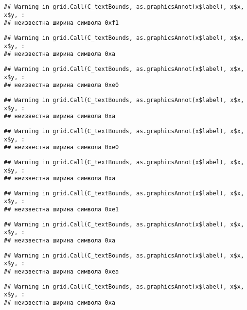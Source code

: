 \documentclass[
]{article}
\begin{document}
\begin{verbatim}
## Warning in grid.Call(C_textBounds, as.graphicsAnnot(x$label), x$x, x$y, :
## неизвестна ширина символа 0xf1
\end{verbatim}

\begin{verbatim}
## Warning in grid.Call(C_textBounds, as.graphicsAnnot(x$label), x$x, x$y, :
## неизвестна ширина символа 0xa
\end{verbatim}

\begin{verbatim}
## Warning in grid.Call(C_textBounds, as.graphicsAnnot(x$label), x$x, x$y, :
## неизвестна ширина символа 0xe0
\end{verbatim}

\begin{verbatim}
## Warning in grid.Call(C_textBounds, as.graphicsAnnot(x$label), x$x, x$y, :
## неизвестна ширина символа 0xa
\end{verbatim}

\begin{verbatim}
## Warning in grid.Call(C_textBounds, as.graphicsAnnot(x$label), x$x, x$y, :
## неизвестна ширина символа 0xe0
\end{verbatim}

\begin{verbatim}
## Warning in grid.Call(C_textBounds, as.graphicsAnnot(x$label), x$x, x$y, :
## неизвестна ширина символа 0xa
\end{verbatim}

\begin{verbatim}
## Warning in grid.Call(C_textBounds, as.graphicsAnnot(x$label), x$x, x$y, :
## неизвестна ширина символа 0xe1
\end{verbatim}

\begin{verbatim}
## Warning in grid.Call(C_textBounds, as.graphicsAnnot(x$label), x$x, x$y, :
## неизвестна ширина символа 0xa
\end{verbatim}

\begin{verbatim}
## Warning in grid.Call(C_textBounds, as.graphicsAnnot(x$label), x$x, x$y, :
## неизвестна ширина символа 0xea
\end{verbatim}

\begin{verbatim}
## Warning in grid.Call(C_textBounds, as.graphicsAnnot(x$label), x$x, x$y, :
## неизвестна ширина символа 0xa
\end{verbatim}
\end{document}
